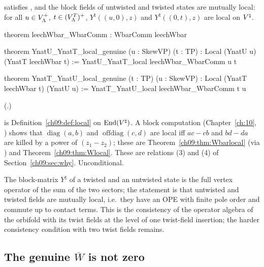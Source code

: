 \begin{theorem}\label{ch09:thm:genuine}
 satisfies , and the block fields of untwisted and twisted states
are mutually local: for all $u\in V_{\Lambda}^{+}$, $t\in(V_{\Lambda}^{T})^{+}$, $Y^\natural((u,0),z)$ and
$Y^\natural((0,t),z)$ are local on ${V^{\natural}}$.
\end{theorem}
\begin{leancode}
theorem leechWbar_WbarComm : WbarComm leechWbar

theorem YnatU_YnatT_local_genuine (u : SkewVP) (t : TP) : Local (YnatU u) (YnatT leechWbar t) :=
  YnatU_YnatT_local leechWbar_WbarComm u t

theorem YnatT_YnatU_local_genuine (t : TP) (u : SkewVP) : Local (YnatT leechWbar t) (YnatU u) :=
  YnatT_YnatU_local leechWbar_WbarComm t u
\end{leancode}
(.)
\begin{dictionary}
 is Definition~\ref{ch09:def:local} on $\operatorname{End}({V^{\natural}})$. A block computation (Chapter~\ref{ch:10},
) shows that $\operatorname{diag}(a,b)$ and $\operatorname{offdiag}(c,d)$ are local
iff $a c-c b$ and $b d-d a$ are killed by a power of $(z_1-z_2)$; these are
Theorem~\ref{ch09:thm:Wbarlocal} (via ) and Theorem~\ref{ch09:thm:Wlocal}. These are
relations (3) and (4) of Section~\ref{ch09:sec:why}. Unconditional.
\end{dictionary}

\begin{physics}
The block-matrix $Y^\natural$ of a twisted and an untwisted state is the full vertex operator of the sum of the two sectors; the statement is that untwisted and twisted fields are mutually local, i.e.\ they have an OPE with finite pole order and commute up to contact terms. This is the consistency of the operator algebra of the orbifold with its twist fields at the level of one twist-field insertion; the harder consistency condition with two twist fields remains.
\end{physics}

\subsection{The genuine \texorpdfstring{$\overline{W}$}{Wbar} is not zero}

